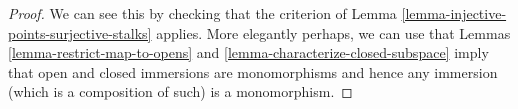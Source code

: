 \documentclass{stacks-project}
\theoremstyle{plain}
\theoremstyle{definition}
\theoremstyle{remark}
\numberwithin{equation}{subsection}
\begin{document}
\begin{proof}
We can see this by checking that the criterion of
Lemma \ref{lemma-injective-points-surjective-stalks} applies.
More elegantly perhaps, we can use that
Lemmas \ref{lemma-restrict-map-to-opens} and
\ref{lemma-characterize-closed-subspace} imply that
open and closed immersions are monomorphisms and hence
any immersion (which is a composition of such)
is a monomorphism.
\end{proof}
\end{document}
